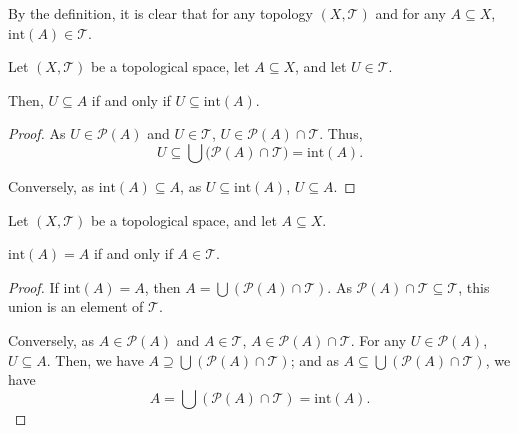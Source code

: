 \documentclass{report}
\begin{document}
\begin{note}
	By the definition, it is clear that for any topology $(X, \mathcal T)$ and for any $A \subseteq X$, $\mathrm{int}(A) \in \mathcal T$.
\end{note}


\begin{lemma}
	Let $(X, \mathcal T)$ be a topological space, let $A \subseteq X$, and let $U \in \mathcal T$.
	
	Then, $U \subseteq A$ if and only if $U \subseteq \mathrm{int}(A)$.
	
	\begin{proof}
		As $U \in \mathcal P(A)$ and $U \in \mathcal T$, $U \in \mathcal P(A) \cap \mathcal T$. Thus,
		$$
		U \subseteq \bigcup \mathcal (\mathcal P(A) \cap \mathcal T) = \mathrm{int}(A).
		$$
		\qedlm
		
		Conversely, as $\mathrm{int}(A) \subseteq A$, as $U \subseteq \mathrm{int}(A)$, $U \subseteq A$.
	\end{proof}
\end{lemma}


\begin{lemma}
	Let $(X, \mathcal T)$ be a topological space, and let $A \subseteq X$.
	
	$\mathrm{int}(A) = A$ if and only if $A \in \mathcal T$.
	
	\begin{proof}	
		If $\mathrm{int}(A) = A$, then $A = \bigcup (\mathcal P (A) \cap\mathcal T)$. As $\mathcal P(A) \cap \mathcal T \subseteq \mathcal T$, this union is an element of $\mathcal T$.
		\qedlm
		
		Conversely, as $A \in \mathcal P(A)$ and $A \in \mathcal T$, $A \in \mathcal P(A) \cap \mathcal T$. For any $U \in \mathcal P(A)$, $U \subseteq A$. Then, we have $A \supseteq \bigcup (\mathcal P(A) \cap \mathcal T)$; and as $A \subseteq \bigcup (\mathcal P(A) \cap \mathcal T)$, we have
		$$
		A = \bigcup (\mathcal P(A) \cap \mathcal T) = \mathrm{int}(A).
		$$
	\end{proof}
\end{lemma}
\end{document}
